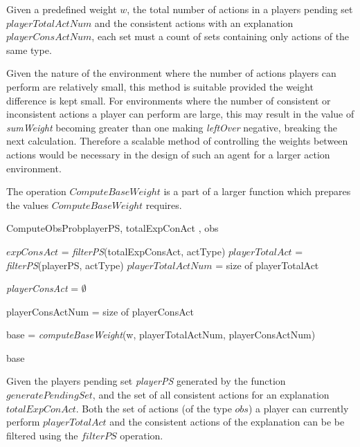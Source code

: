 \documentclass[parskip]{cs4rep}
\begin{document}
Given a predefined weight $w$, the total number of actions in a players pending set $playerTotalActNum$ and the consistent actions with an explanation $playerConsActNum$, each set must a count of sets containing only actions of the same type. 

Given the nature of the environment where the number of actions players can perform are relatively small, this method is suitable provided the weight difference is kept small. For environments where the number of consistent or inconsistent actions a player can perform are large, this may result in the value of \textit{sumWeight} becoming greater than one making \textit{leftOver} negative, breaking the next calculation. Therefore a scalable method of controlling the weights between actions would be necessary in the design of such an agent for a larger action environment.

The operation $ComputeBaseWeight$ is a part of a larger function which prepares the values  $ComputeBaseWeight$ requires.

\begin{pseudocode}[ruled]{ComputeObsProb}{playerPS, totalExpConAct , obs}
\begin{algorithm}[H]
$expConsAct$ = \textit{filterPS}(totalExpConsAct, actType) \newline
$playerTotalAct$ = \textit{filterPS}(playerPS, actType)\newline
$playerTotalActNum$ = size of playerTotalAct \newline

\textit{playerConsAct} = $\emptyset$ \newline


playerConsActNum = size of playerConsAct\newline

base = \textit{computeBaseWeight}(w, playerTotalActNum, playerConsActNum)\newline

\Return base

\end{algorithm}
\end{pseudocode}

Given the players pending set \textit{playerPS} generated by the function $generatePendingSet$, and the set of all consistent actions for an explanation $totalExpConAct$. Both the set of actions (of the type $obs$)  a player can currently perform $playerTotalAct$  and the consistent actions of the explanation can be be filtered using the $filterPS$ operation. 
\end{document}
